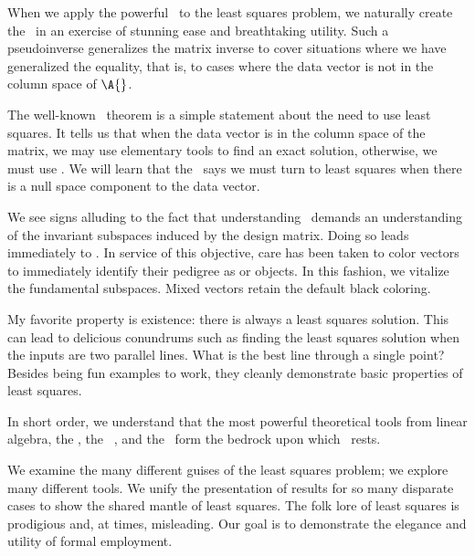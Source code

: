 When we apply the powerful \asvd\ to the least squares problem, we naturally create the \mpi\ in an exercise of stunning ease and breathtaking utility. Such a pseudoinverse generalizes the matrix inverse to cover situations where we have generalized the equality, that is, to cases where the data vector is not in the column space of $\A{}$. 

The well-known \fa \  theorem is a simple statement about the need to use least squares. It tells us that when the data vector is in the column space of the matrix, we may use elementary tools to find an exact solution, otherwise, we must use \tmls. We will learn that the \fa \  says we must turn to least squares when there is a null space component to the data vector. 

We see signs alluding to the fact that understanding \tmls\ demands an understanding of the invariant subspaces induced by the design matrix. Doing so leads immediately to \ftola. In service of this objective, care has been taken to color vectors to immediately identify their pedigree as  or  objects. In this fashion, we vitalize the fundamental subspaces. Mixed vectors retain the default black coloring.

My favorite property is existence: there is always a least squares solution. This can lead to delicious	 conundrums such as finding the least squares solution when the inputs are two parallel lines. What is the best line through a single point? Besides being fun examples to work, they cleanly demonstrate basic properties of least squares.

In short order, we understand that the most powerful theoretical tools from linear algebra, the \ftola, the \fa \ , and the \asvd \ form the bedrock upon which \tmls\ rests.

We examine the many different guises of the least squares problem; we explore many different tools. We unify the presentation of results for so many disparate cases to show the shared mantle of least squares. The folk lore of least squares is prodigious and, at times, misleading. Our goal is to demonstrate the elegance and utility of formal employment.

